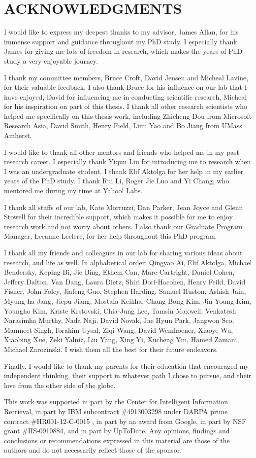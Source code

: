 \chapter{ACKNOWLEDGMENTS}
I would like to express my deepest thanks to my advisor, James Allan, for his immense support and guidance throughout my PhD study. I especially thank James for giving me lots of freedom in research, which makes the years of PhD study a very enjoyable journey. 

I thank my committee members, Bruce Croft, David Jensen and Micheal Lavine, for their valuable feedback. I also thank Bruce for his influence on our lab that I have enjoyed, David for influencing me in conducting scientific research, Micheal for his inspiration on part of this thesis. I thank all other research scientists who helped me specifically on this thesis work, including Zhicheng Dou from Microsoft Research Asia, David Smith, Henry Field, Limi Yao and Bo Jiang from UMass Amherst.

I would like to thank all other mentors and friends who helped me in my past research career. I especially thank Yiqun Liu for introducing me to research when I was an undergraduate student. I thank Elif Aktolga for her help in my earlier years of the PhD study. I thank Rui Li, Roger Jie Luo and Yi Chang, who mentored me during my time at Yahoo! Labs. 

I thank all staffs of our lab, Kate Morruzzi, Dan Parker, Jean Joyce and Glenn Stowell for their incredible support, which makes it possible for me to enjoy research work and not worry about others. I also thank our Graduate Program Manager, Leeanne Leclerc, for her help throughout this PhD program.

I thank all my friends and colleagues in our lab for sharing various ideas about research, and life as well. In alphabetical order: Qingyao Ai, Elif Aktolga, Michael Bendersky, Keping Bi, Jie Bing, Ethem Can, Marc Cartright, Daniel Cohen, Jeffery Dalton, Van Dang, Laura Dietz, Shiri Dori-Hacohen, Henry Feild, David Fisher, John Foley, Jiafeng Guo, Stephen Harding, Samuel Huston, Ashish Jain, Myung-ha Jang, Jiepu Jiang, Mostafa Keikha, Chang Bong Kim, Jin Young Kim, Youngho Kim, Kriste Krstovski, Chia-Jung Lee, Tamsin Maxwell, Venkatesh Narasimha Murthy, Nada Naji, David Novak, Jae Hyun Park, Jangwon Seo,  Manmeet Singh, Ibrahim Uysal, Ziqi Wang, David Wemhoener, Xiaoye Wu, Xiaobing Xue, Zeki Yalniz, Liu Yang, Xing Yi, Xucheng Yin, Hamed Zamani, Michael Zarozinski. I wish them all the best for their future endeavors.

Finally, I would like to thank my parents for their education that encouraged my independent thinking, their support in whatever path I chose to pursue, and their love from the other side of the globe.

This work was supported in part by the Center for Intelligent Information Retrieval, in part by IBM subcontract \#4913003298 under DARPA prime contract \#HR001-12-C-0015 , in part by an award from Google, in part by NSF grant \#IIS-0910884, and in part by UpToDate. Any opinions, findings and conclusions or recommendations expressed in this material are those of the authors and do not necessarily reflect those of the sponsor.